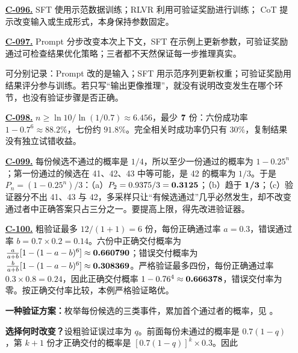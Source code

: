 \begin{enumerate}[label={},leftmargin=4.8em,itemsep=4pt]
\item[\textbf{\hyperref[exercise:reference-policy-role]{C-096.}}] \leavevmode{}\label{solution:C-096}\label{solution:reference-policy-role}SFT 使用示范数据训练；RLVR 利用可验证奖励进行训练；
CoT 提示改变输入或生成形式，本身保持参数固定。
\item[\textbf{\hyperref[exercise:reasoning-interventions]{C-097.}}] \leavevmode{}\label{solution:C-097}\label{solution:reasoning-interventions}Prompt 分步改变本次上下文，SFT 在示例上更新参数，可验证奖励通过可检查结果优化策略；三者都不天然保证每一步推理真实。\par 可分别记录：Prompt 改的是输入；SFT 用示范序列更新权重；可验证奖励用结果评分参与训练。若只写“输出更像推理”，就没有说明改变发生在哪个环节，也没有验证步骤是否正确。
\item[\textbf{\hyperref[exercise:candidate-success-budget]{C-098.}}] \leavevmode{}\label{solution:C-098}\label{solution:candidate-success-budget}$n\ge\ln10/\ln(1/0.7)\approx6.456$，最少 $\boldsymbol{7}$ 份：六份成功率 $1-0.7^6\approx88.2\%$，七份约 $91.8\%$。完全相关时成功率仍只有 $30\%$，复制结果没有独立试错收益。
\item[\textbf{\hyperref[exercise:faulty-verifier-limit]{C-099.}}] \leavevmode{}\label{solution:C-099}\label{solution:faulty-verifier-limit}每份候选不通过的概率是 $1/4$，所以至少一份通过的概率为 $1-0.25^n$；第一份通过的候选在 41、42、43 中等可能，是 42 的概率为 $1/3$。于是 $P_n=(1-0.25^n)/3$：（a）$P_2=0.9375/3=\boldsymbol{0.3125}$；（b）趋于 $\boldsymbol{1/3}$；（c）验证器分不出 41、43 与 42，多采样只让“有候选通过”几乎必然发生，却不改变通过者中正确答案只占三分之一。要提高上限，得先改进验证器。
\item[\textbf{\hyperref[exercise:verifier-budget-design]{C-100.}}] \leavevmode{}\label{solution:C-100}\label{solution:verifier-budget-design}粗验证最多 $12/(1+1)=6$ 份，每份正确通过率 $a=0.3$，错误通过率 $b=0.7\times0.2=0.14$。六份中正确交付概率为 $\frac{a}{a+b}[1-(1-a-b)^6]\approx\boldsymbol{0.660790}$；错误交付概率为 $\frac{b}{a+b}[1-(1-a-b)^6]\approx\boldsymbol{0.308369}$。严格验证最多四份，每份正确通过率 $0.3\times0.8=0.24$，因此正确交付概率 $1-0.76^4\approx\boldsymbol{0.666378}$，错误交付率为零。按正确交付率比较，本例严格验证略优。\par\textbf{一种验证方案：}枚举每份候选的三类事件，累加首个通过者的概率，见 。\par\textbf{选择何时改变？}设粗验证误过率为 $q$。前面每份未通过的概率是 $0.7(1-q)$，第 $k+1$ 份才正确交付的概率是 $[0.7(1-q)]^k\times0.3$。因此

\end{enumerate}
